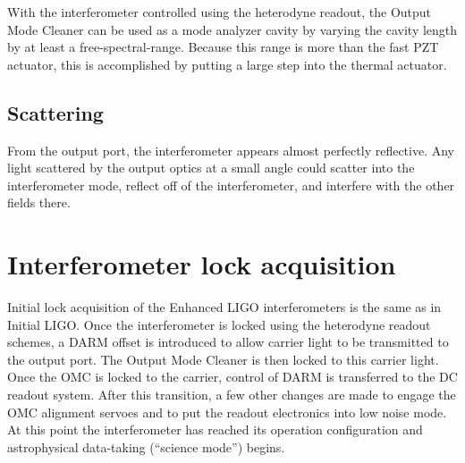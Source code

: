 With the interferometer controlled using the heterodyne readout, the
Output Mode Cleaner can be used as a mode analyzer cavity by varying
the cavity length by at least a free-spectral-range. Because this
range is more than the fast PZT actuator, this is accomplished by
putting a large step into the thermal actuator.


\subsection{Scattering}

From the output port, the interferometer appears almost perfectly
reflective.  Any light scattered by the output optics at a small angle
could scatter into the interferometer mode, reflect off of the
interferometer, and interfere with the other fields there.


\section{Interferometer lock acquisition}

Initial lock acquisition of the Enhanced LIGO interferometers is the
same as in Initial LIGO\cite{Evans2002Lock}. Once the interferometer is locked using the
heterodyne readout schemes, a DARM offset is introduced to allow carrier
light to be transmitted to the output port. The Output Mode Cleaner
is then locked to this carrier light. Once the OMC is locked to the
carrier, control of DARM is transferred to the DC readout system.
After this transition, a few other changes are made to engage the
OMC alignment servoes and to put the readout electronics into low
noise mode. At this point the interferometer has reached its operation
configuration and astrophysical data-taking ({}``science mode'')
begins.


